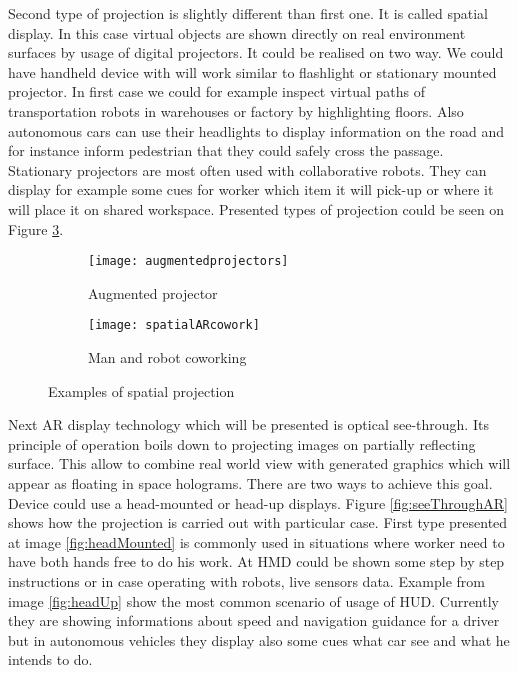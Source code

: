 \documentclass[printmode,en]{mgr}
\begin{document}
Second type of projection is slightly different than first one. It is called spatial display. In this case virtual objects are shown directly on real environment surfaces by usage of digital projectors. It could be realised on two way. We could have handheld device with will work similar to flashlight or stationary mounted projector. In first case we could for example inspect virtual paths of transportation robots in warehouses or factory by highlighting floors. Also autonomous cars can use their headlights to display information on the road and for instance inform pedestrian that they could safely cross the passage. Stationary projectors are most often used with collaborative robots. They can display for example some cues for worker which item it will pick-up or where it will place it on shared workspace. Presented types of projection could be seen on Figure \ref{fig:spatialAR}.

\begin{figure}[!ht]
\centering
\begin{subfigure}{.4\textwidth}
  \centering
  \texttt{[image: augmentedprojectors]}
  \caption{Augmented projector}
  \label{fig:augmentedprojectors}
\end{subfigure}%
\begin{subfigure}{.4\textwidth}
  \centering
  \texttt{[image: spatialARcowork]}
  \caption{Man and robot coworking}
  \label{fig:spatialARcowork}
\end{subfigure}
\caption{Examples of spatial projection}
\label{fig:spatialAR}
\end{figure}

Next AR display technology which will be presented is optical see-through. Its principle of operation boils down to projecting images on partially reflecting surface. This allow to combine real world view with generated graphics which will appear as floating in space holograms. There are two ways to achieve this goal. Device could use a head-mounted or head-up displays. Figure \ref{fig:seeThroughAR} shows how the projection is carried out with particular case. First type presented at image \ref{fig:headMounted} is commonly used in situations where worker need to have both hands free to do his work. At HMD could be shown some step by step instructions or in case operating with robots, live sensors data. Example from image \ref{fig:headUp} show the most common scenario of usage of HUD. Currently they are showing informations about speed and navigation guidance for a driver but in autonomous vehicles they display also some cues what car see and what he intends to do.
\end{document}
